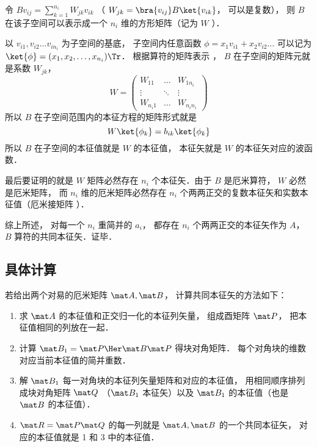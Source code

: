 令 $B v_{ij} = \sum_{k=1}^{n_i} W_{jk}v_{ik}$ （ $W_{jk} = \bra{v_{ij}} B \ket{v_{ik}}$， 可以是复数）， 则 $B$ 在该子空间可以表示成一个 $n_i$ 维的方形矩阵（记为 $W$ ）．

以 $v_{i1}, v_{i2} \dots v_{i n_i}$ 为子空间的基底， 子空间内任意函数 $\phi  = x_1 v_{i1} + x_2 v_{i2}\dots$ 可以记为 $\ket{\phi} = (x_1, x_2, \dots, x_{n_i})\Tr$． 根据算符的矩阵表示
， $B$ 在子空间的矩阵元就是系数 $W_{jk}$， 
\begin{equation}
W = \begin{pmatrix}
W_{11} & \ldots & W_{1 n_i}\\
\vdots & \ddots & \vdots \\
W_{n_i 1} & \ldots & W_{n_i n_i}
\end{pmatrix}
\end{equation}
所以 $B$ 在子空间范围内的本征方程的矩阵形式就是
\begin{equation}
W \ket{\phi_k} = b_{ik} \ket{\phi_k}
\end{equation}
所以 $B$ 在子空间的本征值就是 $W$ 的本征值， 本征矢就是 $W$ 的本征矢对应的波函数．

最后要证明的就是 $W$ 矩阵必然存在 $n_i$ 个本征矢．由于 $B$ 是厄米算符，  $W$ 必然是厄米矩阵， 而 $n_i$ 维的厄米矩阵必然存在 $n_i$ 个两两正交的复数本征矢和实数本征值（厄米接矩阵%
）．

综上所述， 对每一个 $n_i$ 重简并的 $a_i$，  都存在 $n_i$ 个两两正交的本征矢作为 $A$，  $B$ 算符的共同本征矢．证毕．

\subsection{具体计算}
若给出两个对易的厄米矩阵 $\mat A, \mat B$， 计算共同本征矢的方法如下：
\begin{enumerate}
\item 求 $\mat A$ 的本征值和正交归一化的本征列矢量， 组成酉矩阵 $\mat P$， 把本征值相同的列放在一起．
\item 计算 $\mat B_1 = \mat P\Her \mat B\mat P$ 得块对角矩阵． 每个对角块的维数对应当前本征值的简并重数．
\item 解 $\mat B_1$ 每一对角块的本征列矢量矩阵和对应的本征值， 用相同顺序排列成块对角矩阵 $\mat Q$ （$\mat B_1$ 本征矢）以及 $\mat B_1$ 的本征值（也是 $\mat B$ 的本征值）．
\item $\mat R = \mat P\mat Q$ 的每一列就是 $\mat A, \mat B$ 的一个共同本征矢， 对应的本征值就是 1 和 3 中的本征值．
\end{enumerate}

